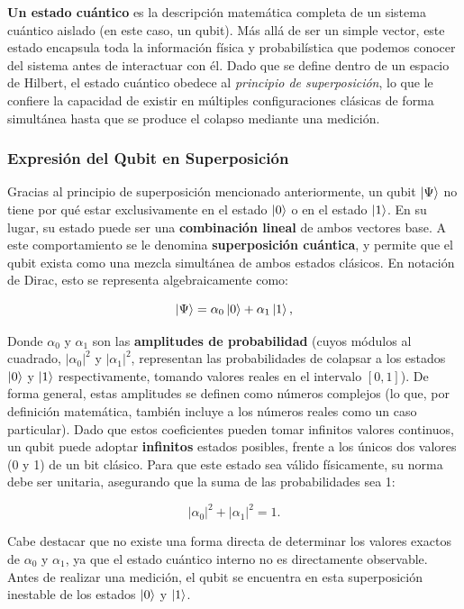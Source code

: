 \textbf{Un estado cuántico} es la descripción matemática completa de un sistema cuántico aislado (en este caso, un \gls{qubit}). Más allá de ser un simple vector, este estado encapsula toda la información física y probabilística que podemos conocer del sistema antes de interactuar con él. Dado que se define dentro de un espacio de Hilbert, el estado cuántico obedece al \textit{principio de superposición}, lo que le confiere la capacidad de existir en múltiples configuraciones clásicas de forma simultánea hasta que se produce el colapso mediante una medición.

\subsubsection{Expresión del Qubit en Superposición}
Gracias al principio de superposición mencionado anteriormente, un qubit $\ket{\Psi}$ no tiene por qué estar exclusivamente en el estado $\ket{0}$ o en el estado $\ket{1}$. En su lugar, su estado puede ser una \textbf{combinación lineal} de ambos vectores base. A este comportamiento se le denomina \textbf{superposición cuántica}, y permite que el qubit exista como una mezcla simultánea de ambos estados clásicos. En notación de Dirac, esto se representa algebraicamente como:

\[
    \ket{\Psi} = \alpha_0\ket{0} + \alpha_1\ket{1},
\]

Donde $\alpha_0$ y $\alpha_1$ son las \textbf{amplitudes de probabilidad} (cuyos módulos al cuadrado, $|\alpha_0|^2$ y $|\alpha_1|^2$, representan las probabilidades de colapsar a los estados $\ket{0}$ y $\ket{1}$ respectivamente, tomando valores reales en el intervalo $[0,1]$). De forma general, estas amplitudes se definen como números complejos (lo que, por definición matemática, también incluye a los números reales como un caso particular). Dado que estos coeficientes pueden tomar infinitos valores continuos, un qubit puede adoptar \textbf{infinitos} estados posibles, frente a los únicos dos valores (0 y 1) de un bit clásico. Para que este estado sea válido físicamente, su norma debe ser unitaria, asegurando que la suma de las probabilidades sea 1:

\[
    |\alpha_0|^2 + |\alpha_1|^2 = 1.
\]

Cabe destacar que no existe una forma directa de determinar los valores exactos de $\alpha_0$ y $\alpha_1$, ya que el estado cuántico interno no es directamente observable. Antes de realizar una medición, el qubit se encuentra en esta superposición inestable de los estados $\ket{0}$ y $\ket{1}$.

